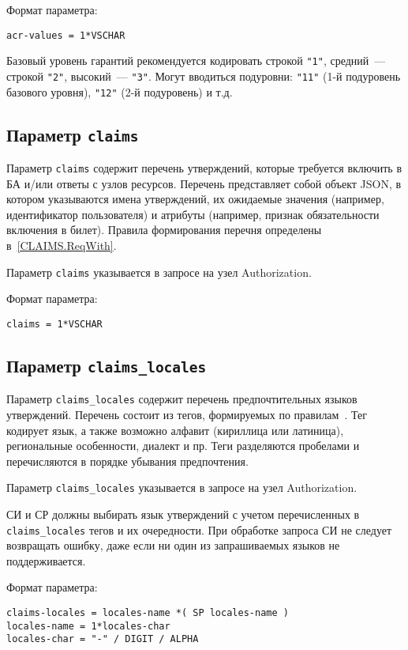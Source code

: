 Формат параметра:
\begin{lstlisting}
acr-values = 1*VSCHAR
\end{lstlisting}

Базовый уровень гарантий рекомендуется кодировать строкой \lstinline{"1"},
средний~--- строкой \lstinline{"2"}, высокий~--- \lstinline{"3"}.
%
Могут вводиться подуровни: \lstinline{"11"} (1-й подуровень базового уровня), 
\lstinline{"12"} (2-й подуровень) и т.д.

\subsection{Параметр \lstinline{claims}}\label{PARAMS.Claims} 

Параметр \lstinline{claims} содержит перечень утверждений,
которые требуется включить в БА и/или ответы с узлов ресурсов.
%
Перечень представляет собой объект JSON, в котором указываются 
имена утверждений, их ожидаемые значения (например, идентификатор пользователя) 
и атрибуты (например, признак обязательности включения в билет).
%
Правила формирования перечня определены в~\ref{CLAIMS.ReqWith}.

Параметр \lstinline{claims} указывается в запросе на узел Authorization.

Формат параметра:
\begin{lstlisting}
claims = 1*VSCHAR
\end{lstlisting}

\subsection{Параметр \lstinline{claims_locales}}\label{PARAMS.ClaimsLocales} 

Параметр \lstinline{claims_locales} содержит перечень предпочтительных 
языков утверждений.
%
Перечень состоит из тегов, формируемых по правилам~\cite{RFC5646}. 
%
Тег кодирует язык, а также возможно алфавит (кириллица или латиница), 
региональные особенности, диалект и пр. 
%
Теги разделяются пробелами и перечисляются в порядке убывания предпочтения.

Параметр \lstinline{claims_locales} указывается в запросе на узел Authorization.

СИ и СР должны выбирать язык утверждений с учетом перечисленных в 
\lstinline{claims_locales} тегов и их очередности. 
%
При обработке запроса СИ не следует возвращать ошибку, даже если ни один из 
запрашиваемых языков не поддерживается.

Формат параметра:
\begin{lstlisting}
claims-locales = locales-name *( SP locales-name )
locales-name = 1*locales-char
locales-char = "-" / DIGIT / ALPHA
\end{lstlisting}

